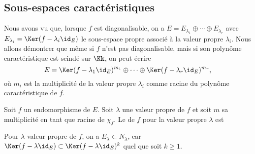 \documentclass[12pt, class=report,crop=false]{standalone}
\begin{document}
\subsection{Sous-espaces caractéristiques}

Nous avons vu que, lorsque $f$ est diagonalisable, 
on a $E=E_{\lambda_1}\oplus\cdots\oplus E_{\lambda_r}$ avec 
$E_{\lambda_i}=\Ker(f-\lambda_i\id_E)$ le sous-espace propre associé 
à la valeur propre $\lambda_i$. Nous allons démontrer que même si $f$ 
n'est pas diagonalisable, mais si son polynôme caractéristique est scindé sur $\Kk$, on peut écrire
$$E=\Ker(f-\lambda_1\id_E)^{m_1}\oplus\cdots\oplus\Ker(f-\lambda_r\id_E)^{m_r},$$
où $m_i$ est la multiplicité de la valeur propre $\lambda_i$ comme 
racine du polynôme caractéristique de $f$.


\begin{definition}
Soit $f$ un endomorphisme de $E$. Soit $\lambda$ une valeur propre de $f$ et soit $m$ sa multiplicité
en tant que racine de $\chi_f$. Le  de $f$ pour la 
valeur propre $\lambda$ est 
\end{definition} 

Pour $\lambda$ valeur propre de $f$, on a $E_\lambda \subset N_\lambda$, car 
$\Ker(f-\lambda\id_E) \subset \Ker(f-\lambda\id_E)^{k}$ quel que soit $k \ge 1$.
\end{document}

